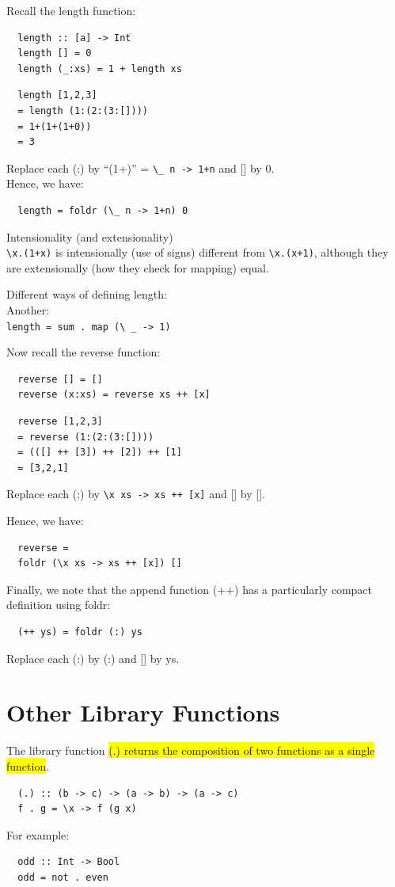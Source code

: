 \documentclass[tikz,border=10pt]{project_plan}
\begin{document}
Recall the length function:
\begin{lstlisting}
  length :: [a] -> Int
  length [] = 0
  length (_:xs) = 1 + length xs
\end{lstlisting}

\begin{lstlisting}
  length [1,2,3]
  = length (1:(2:(3:[])))
  = 1+(1+(1+0))
  = 3
\end{lstlisting}
Replace each (:) by “(1+)” = \lstinline?\_ n -> 1+n? and [] by 0.\\
Hence, we have:
\begin{lstlisting}
  length = foldr (\_ n -> 1+n) 0
\end{lstlisting}

Intensionality (and extensionality)\\
\lstinline?\x.(1+x)? is intensionally (use of signs) different from \lstinline?\x.(x+1)?,
although they are extensionally (how they check for mapping) equal.

Different ways of defining length:\\
Another:\\
\lstinline|length = sum . map (\ _ -> 1)|

Now recall the reverse function:
\begin{lstlisting}
  reverse [] = []
  reverse (x:xs) = reverse xs ++ [x]
\end{lstlisting}

\begin{lstlisting}
  reverse [1,2,3]
  = reverse (1:(2:(3:[])))
  = (([] ++ [3]) ++ [2]) ++ [1]
  = [3,2,1]
\end{lstlisting}
Replace each (:) by \lstinline?\x xs -> xs ++ [x]? and [] by [].

Hence, we have:
\begin{lstlisting}
  reverse =
  foldr (\x xs -> xs ++ [x]) []
\end{lstlisting}

Finally, we note that the append function (++) has a
particularly compact definition using foldr:
\begin{lstlisting}
  (++ ys) = foldr (:) ys
\end{lstlisting}
Replace each (:) by (:) and [] by ys.

\section{Other Library Functions}

The library function \colorbox{yellow}{(.) returns the composition of two
  functions as a single function}.
\begin{lstlisting}
  (.) :: (b -> c) -> (a -> b) -> (a -> c)
  f . g = \x -> f (g x)
\end{lstlisting}
For example:
\begin{lstlisting}
  odd :: Int -> Bool
  odd = not . even
\end{lstlisting}
\end{document}
